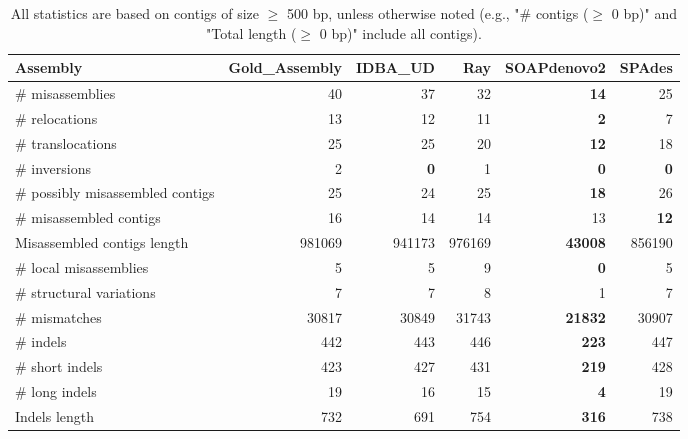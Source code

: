 \documentclass[12pt,a4paper]{article}
\begin{document}
\begin{table}[ht]
\begin{center}
\caption{All statistics are based on contigs of size $\geq$ 500 bp, unless otherwise noted (e.g., "\# contigs ($\geq$ 0 bp)" and "Total length ($\geq$ 0 bp)" include all contigs).}
\begin{tabular}{|l*{5}{|r}|}
\hline
Assembly & Gold\_Assembly & IDBA\_UD & Ray & SOAPdenovo2 & SPAdes \\ \hline
\# misassemblies & 40 & 37 & 32 & {\bf 14} & 25 \\ \hline
\hspace{5mm}\# relocations & 13 & 12 & 11 & {\bf 2} & 7 \\ \hline
\hspace{5mm}\# translocations & 25 & 25 & 20 & {\bf 12} & 18 \\ \hline
\hspace{5mm}\# inversions & 2 & {\bf 0} & 1 & {\bf 0} & {\bf 0} \\ \hline
\# possibly misassembled contigs & 25 & 24 & 25 & {\bf 18} & 26 \\ \hline
\# misassembled contigs & 16 & 14 & 14 & 13 & {\bf 12} \\ \hline
Misassembled contigs length & 981069 & 941173 & 976169 & {\bf 43008} & 856190 \\ \hline
\# local misassemblies & 5 & 5 & 9 & {\bf 0} & 5 \\ \hline
\# structural variations & 7 & 7 & 8 & 1 & 7 \\ \hline
\# mismatches & 30817 & 30849 & 31743 & {\bf 21832} & 30907 \\ \hline
\# indels & 442 & 443 & 446 & {\bf 223} & 447 \\ \hline
\hspace{5mm}\# short indels & 423 & 427 & 431 & {\bf 219} & 428 \\ \hline
\hspace{5mm}\# long indels & 19 & 16 & 15 & {\bf 4} & 19 \\ \hline
Indels length & 732 & 691 & 754 & {\bf 316} & 738 \\ \hline
\end{tabular}
\end{center}
\end{table}
\end{document}
